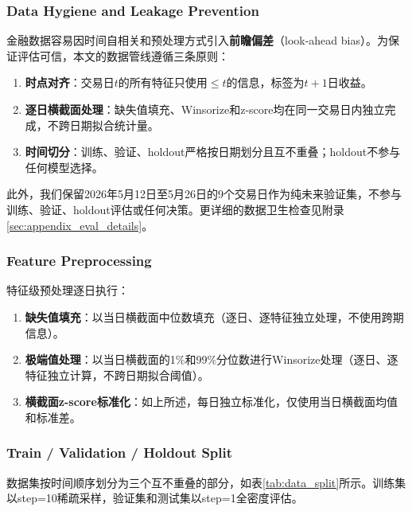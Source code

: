 \subsubsection{Data Hygiene and Leakage Prevention}

金融数据容易因时间自相关和预处理方式引入\textbf{前瞻偏差}（look-ahead bias）。为保证评估可信，本文的数据管线遵循三条原则：

\begin{enumerate}[leftmargin=*, itemsep=2pt]
    \item \textbf{时点对齐}：交易日$t$的所有特征只使用$\le t$的信息，标签为$t+1$日收益。
    \item \textbf{逐日横截面处理}：缺失值填充、Winsorize和z-score均在同一交易日内独立完成，不跨日期拟合统计量。
    \item \textbf{时间切分}：训练、验证、holdout严格按日期划分且互不重叠；holdout不参与任何模型选择。
\end{enumerate}

此外，我们保留2026年5月12日至5月26日的9个交易日作为纯未来验证集，不参与训练、验证、holdout评估或任何决策。更详细的数据卫生检查见附录\ref{sec:appendix_eval_details}。

\subsubsection{Feature Preprocessing}

特征级预处理逐日执行：

\begin{enumerate}[leftmargin=*, itemsep=2pt]
    \item \textbf{缺失值填充}：以当日横截面中位数填充（逐日、逐特征独立处理，不使用跨期信息）。
    \item \textbf{极端值处理}：以当日横截面的1\%和99\%分位数进行Winsorize处理（逐日、逐特征独立计算，不跨日期拟合阈值）。
    \item \textbf{横截面z-score标准化}：如上所述，每日独立标准化，仅使用当日横截面均值和标准差。
\end{enumerate}

\subsubsection{Train / Validation / Holdout Split}

数据集按时间顺序划分为三个互不重叠的部分，如表\ref{tab:data_split}所示。训练集以step=10稀疏采样，验证集和测试集以step=1全密度评估。

